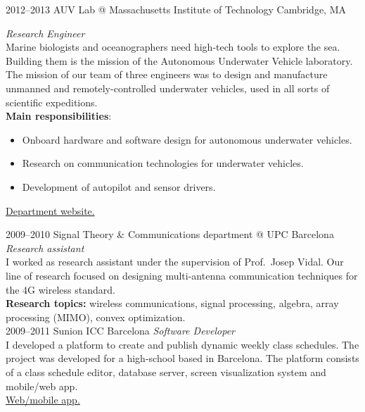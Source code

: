\documentclass[]{friggeri-cv} %
\begin{document}
\begin{entrylist}

\entry
{2012--2013}
{AUV Lab @ Massachusetts Institute of Technology}
{Cambridge, MA}
{%
\emph{Research Engineer} \\
Marine biologists and oceanographers need high-tech tools to explore the sea.
Building them is the mission of the Autonomous Underwater Vehicle laboratory.
The mission of our team of three engineers was to design and manufacture unmanned
and remotely-controlled underwater vehicles, used in all sorts of scientific expeditions.\\
{\bf Main responsibilities}:
  \begin{itemize}
    \item Onboard hardware and software design for autonomous
      underwater vehicles.
    \item Research on communication technologies for underwater
      vehicles.
    \item Development of autopilot and sensor drivers.
  \end{itemize}
\href{http://seagrant.mit.edu}{{\FA\faExternalLink} Department website.}
}

\end{entrylist}
\begin{entrylist}


\entry
{2009--2010}
{Signal Theory \& Communications department @ UPC}
{Barcelona}
{%
\emph{Research assistant} \\
I worked as research assistant under the supervision of Prof.\ Josep
Vidal. Our line of research focused on designing multi-antenna communication
techniques for the 4G wireless standard. \\
{\bf Research topics:} wireless communications, signal processing,
algebra, array processing (MIMO), convex optimization.
}\\


\entry
{2009--2011}
{Sunion ICC}
{Barcelona}
{%
\emph{Software Developer} \\
I developed a platform to create and publish dynamic weekly class schedules.
The project was developed for a high-school based in Barcelona. The platform
consists of a class schedule editor, database server, screen visualization
system and mobile/web app. \\
\href{http://horari.sunion.net}{{\FA\faExternalLink} Web/mobile app.}
}


\end{entrylist}
\end{document}
